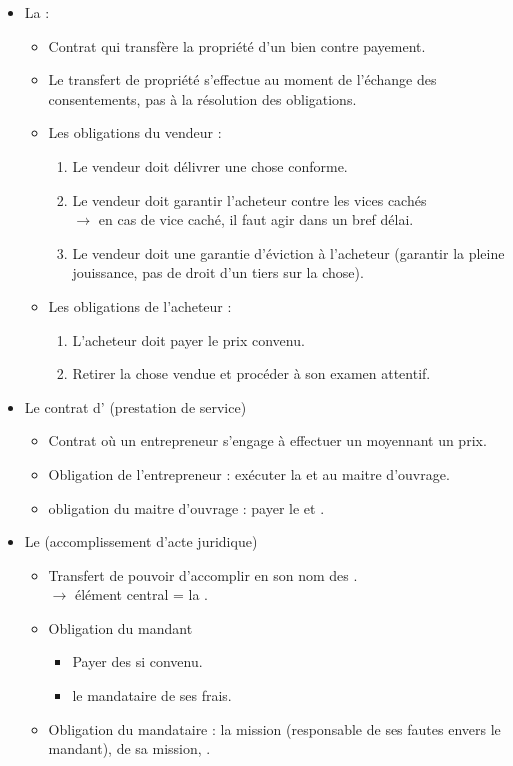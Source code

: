 \begin{itemize}
	\item La  :
	\begin{itemize}
		\item Contrat qui transfère la propriété d'un bien contre payement.
		\item Le transfert de propriété s'effectue au moment de l'échange des consentements, pas à la résolution des obligations.
		\item Les obligations du vendeur :
		\begin{enumerate}
			\item Le vendeur doit délivrer une chose conforme.
			\item Le vendeur doit garantir l'acheteur contre les vices cachés\\
			$\rightarrow$ en cas de vice caché, il faut agir dans un bref délai.
			\item Le vendeur doit une garantie d'éviction à l'acheteur (garantir la pleine jouissance, pas de droit d'un tiers sur la chose).
		\end{enumerate}
		\item Les obligations de l'acheteur :
		\begin{enumerate}
			\item L'acheteur doit payer le prix convenu.
			\item Retirer la chose vendue et procéder à son examen attentif.
		\end{enumerate}
	\end{itemize}
	\item Le contrat d' (prestation de service)
	\begin{itemize}
		\item Contrat où un entrepreneur s'engage à effectuer un  moyennant un prix.
		\item Obligation de l'entrepreneur : exécuter la  et  au maitre d'ouvrage.
		\item obligation du maitre d'ouvrage : payer le  et .
	\end{itemize}
	\item Le  (accomplissement d'acte juridique)
	\begin{itemize}
		\item Transfert de pouvoir d'accomplir en son nom des .\\
		$\rightarrow$ élément central = la .
		\item Obligation du mandant
		\begin{itemize}
		 	\item Payer des  si convenu.
		 	\item {} le mandataire de ses frais.
		 \end{itemize}
		 \item Obligation du mandataire :  la mission (responsable de ses fautes envers le mandant),  de sa mission, .
	\end{itemize}
\end{itemize}
